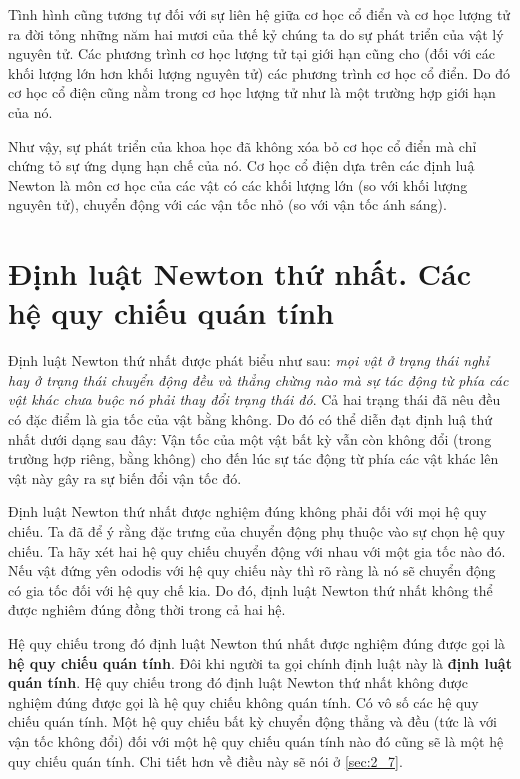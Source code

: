 Tình hình cũng tương tự đối với sự liên hệ giữa cơ học cổ điển và cơ học lượng tử ra đời tỏng những năm hai mươi của thế kỷ chúng ta do sự phát triển của vật lý nguyên tử. Các phương trình cơ học lượng tử tại giới hạn cũng cho (đối với các khối lượng lớn hơn khối lượng nguyên tử) các phương trình cơ học cổ điển. Do đó cơ học cổ điện cũng nằm trong cơ học lượng tử như là một trường hợp giới hạn của nó.

Như vậy, sự phát triển của khoa học đã không xóa bỏ cơ học cổ điển mà chỉ chứng tỏ sự ứng dụng hạn chế của nó. Cơ học cổ điện dựa trên các định luậ Newton là môn cơ học của các vật có các khối lượng lớn (so với khối lượng nguyên tử), chuyển động với các vận tốc nhỏ (so với vận tốc ánh sáng).

\section{Định luật Newton thứ nhất. Các hệ quy chiếu quán tính}\label{sec:2_2}

Định luật Newton thứ nhất được phát biểu như sau: \textit{mọi vật ở trạng thái nghỉ hay ở trạng thái chuyển động đều và thẳng chừng nào mà sự tác động từ phía các vật khác chưa buộc nó phải thay đổi trạng thái đó}. Cả hai trạng thái đã nêu đều có đặc điểm là gia tốc của vật bằng không. Do đó có thể diễn đạt định luậ thứ nhất dưới dạng sau đây: Vận tốc của một vật bất kỳ vẫn còn không đổi (trong trường hợp riêng, bằng không) cho đến lúc sự tác động từ phía các vật khác lên vật này gây ra sự biến đổi vận tốc đó.

Định luật Newton thứ nhất được nghiệm đúng không phải đối với mọi hệ quy chiếu. Ta đã để ý rằng đặc trưng của chuyển động phụ thuộc vào sự chọn hệ quy chiếu. Ta hãy xét hai hệ quy chiếu chuyển động với nhau với một gia tốc nào đó. Nếu vật đứng yên ododis với hệ quy chiếu này thì rõ ràng là nó sẽ chuyển động có gia tốc đối với hệ quy chế kia. Do đó, định luật Newton thứ nhất không thể được nghiêm đúng đồng thời trong cả hai hệ.

Hệ quy chiếu trong đó định luật Newton thú nhất được nghiệm đúng được gọi là \textbf{hệ quy chiếu quán tính}. Đôi khi người ta gọi chính định luật này là \textbf{định luật quán tính}. Hệ quy chiếu trong đó định luật Newton thứ nhất không được nghiệm đúng được gọi là hệ quy chiếu không quán tính. Có vô số các hệ quy chiếu quán tính. Một hệ quy chiếu bất kỳ chuyển động thẳng và đều (tức là với vận tốc không đổi) đối với một hệ quy chiếu quán tính nào đó cũng sẽ là một hệ quy chiếu quán tính. Chi tiết hơn về điều này sẽ nói ở \ref{sec:2_7}.


